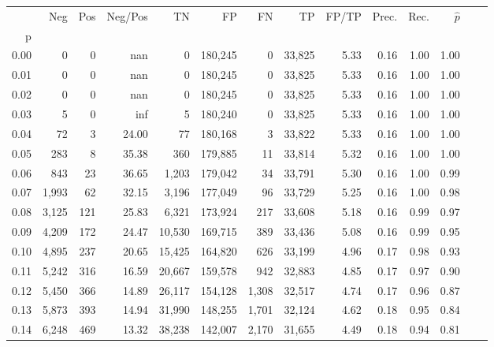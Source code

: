 \begin{tabular}{rrrrrrrrrrrrrr}
\toprule
{} &    Neg &  Pos & Neg/Pos &       TN &       FP &      FN &      TP & FP/TP & Prec. &  Rec. & $\hat{p}$ \\
p    &        &      &         &          &          &         &         &       &       &       &           \\
\midrule
0.00 &      0 &    0 &     nan &        0 &  180,245 &       0 &  33,825 &  5.33 &  0.16 &  1.00 &      1.00 \\
0.01 &      0 &    0 &     nan &        0 &  180,245 &       0 &  33,825 &  5.33 &  0.16 &  1.00 &      1.00 \\
0.02 &      0 &    0 &     nan &        0 &  180,245 &       0 &  33,825 &  5.33 &  0.16 &  1.00 &      1.00 \\
0.03 &      5 &    0 &     inf &        5 &  180,240 &       0 &  33,825 &  5.33 &  0.16 &  1.00 &      1.00 \\
0.04 &     72 &    3 &   24.00 &       77 &  180,168 &       3 &  33,822 &  5.33 &  0.16 &  1.00 &      1.00 \\
0.05 &    283 &    8 &   35.38 &      360 &  179,885 &      11 &  33,814 &  5.32 &  0.16 &  1.00 &      1.00 \\
0.06 &    843 &   23 &   36.65 &    1,203 &  179,042 &      34 &  33,791 &  5.30 &  0.16 &  1.00 &      0.99 \\
0.07 &  1,993 &   62 &   32.15 &    3,196 &  177,049 &      96 &  33,729 &  5.25 &  0.16 &  1.00 &      0.98 \\
0.08 &  3,125 &  121 &   25.83 &    6,321 &  173,924 &     217 &  33,608 &  5.18 &  0.16 &  0.99 &      0.97 \\
0.09 &  4,209 &  172 &   24.47 &   10,530 &  169,715 &     389 &  33,436 &  5.08 &  0.16 &  0.99 &      0.95 \\
0.10 &  4,895 &  237 &   20.65 &   15,425 &  164,820 &     626 &  33,199 &  4.96 &  0.17 &  0.98 &      0.93 \\
0.11 &  5,242 &  316 &   16.59 &   20,667 &  159,578 &     942 &  32,883 &  4.85 &  0.17 &  0.97 &      0.90 \\
0.12 &  5,450 &  366 &   14.89 &   26,117 &  154,128 &   1,308 &  32,517 &  4.74 &  0.17 &  0.96 &      0.87 \\
0.13 &  5,873 &  393 &   14.94 &   31,990 &  148,255 &   1,701 &  32,124 &  4.62 &  0.18 &  0.95 &      0.84 \\
0.14 &  6,248 &  469 &   13.32 &   38,238 &  142,007 &   2,170 &  31,655 &  4.49 &  0.18 &  0.94 &      0.81 \\

\end{tabular}
